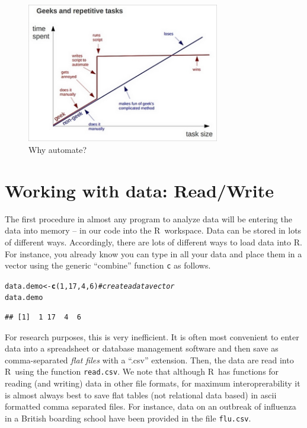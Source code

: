 \documentclass{article}\usepackage[]{graphicx}\usepackage[]{color}
\makeatletter
\newcommand{\hlnum}[1]{\textcolor[rgb]{0.686,0.059,0.569}{#1}}%
\newcommand{\hlcom}[1]{\textcolor[rgb]{0.678,0.584,0.686}{\textit{#1}}}%
\newcommand{\hlstd}[1]{\textcolor[rgb]{0.345,0.345,0.345}{#1}}%
\newcommand{\hlkwb}[1]{\textcolor[rgb]{0.69,0.353,0.396}{#1}}%
\newcommand{\hlkwd}[1]{\textcolor[rgb]{0.737,0.353,0.396}{\textbf{#1}}}%
\newenvironment{kframe}{%
 \def\at@end@of@kframe{}%
 \ifinner\ifhmode%
  \def\at@end@of@kframe{\end{minipage}}%
  \begin{minipage}{\columnwidth}%
 \fi\fi%
 \def\FrameCommand##1{\hskip\@totalleftmargin \hskip-\fboxsep
 \colorbox{shadecolor}{##1}\hskip-\fboxsep
     \hskip-\linewidth \hskip-\@totalleftmargin \hskip\columnwidth}%
 \MakeFramed {\advance\hsize-\width
   \@totalleftmargin\z@ \linewidth\hsize
   \@setminipage}}%
 {\par\unskip\endMakeFramed%
 \at@end@of@kframe}
\newenvironment{knitrout}{}{} %
\newcommand{\R}{\textsf{R}}
\newcommand{\code}[1]{\texttt{#1}}
\theoremstyle{exercise}
\makeatother
\begin{document}
\begin{figure}[h!]
\centering
\includegraphics[width=0.75\textwidth]{automated.jpg}
\caption{Why automate?} 
\end{figure} 

\section{Working with data: Read/Write}
The first procedure in almost any program to analyze data will be entering the data into memory -- in our code into the \R\ workspace. Data can be stored in lots of different ways. Accordingly, there are lots of different ways to load data into \R. For instance, you already know you can type in all your data and place them in a vector using the generic ``combine'' function \code{c} as follows.

\begin{knitrout}
\color{fgcolor}\begin{kframe}
\begin{alltt}
\hlstd{data.demo}\hlkwb{<-}\hlkwd{c}\hlstd{(}\hlnum{1}\hlstd{,}\hlnum{17}\hlstd{,}\hlnum{4}\hlstd{,}\hlnum{6}\hlstd{)}   \hlcom{#create a data vector}
\hlstd{data.demo}
\end{alltt}
\begin{verbatim}
## [1]  1 17  4  6
\end{verbatim}
\end{kframe}
\end{knitrout}

For research purposes, this is very inefficient. It is often most convenient to enter data into a spreadsheet or database management software and then save as comma-separated \emph{flat files} with a ``.csv'' extension. Then, the data are read into \R\ using the function \code{read.csv}. We note that although \R\ has functions for reading (and writing) data in other file formats, for maximum interoprerability it is almost always best to save flat tables (not relational data based) in ascii formatted comma separated files. For instance, data on an outbreak of influenza in a British boarding school have been provided in the file \texttt{flu.csv}.
\end{document}
